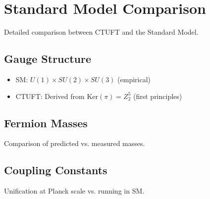 \section{Standard Model Comparison}
\label{sec:sm_comparison}

Detailed comparison between CTUFT and the Standard Model.

\subsection{Gauge Structure}

\begin{itemize}
    \item SM: $U(1) \times SU(2) \times SU(3)$ (empirical)
    \item CTUFT: Derived from $\text{Ker}(\pi) = Z_2^5$ (first principles)
\end{itemize}

\subsection{Fermion Masses}

Comparison of predicted vs. measured masses.

\subsection{Coupling Constants}

Unification at Planck scale vs. running in SM.
